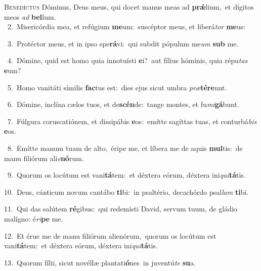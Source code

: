 \lettrine{\initial\textcolor{\initialcolor}{B}}{enedíctus} Dóminus, Deus meus, qui docet manus meas ad \textbf{prǽ}\-lium,~\star et dígitos meos \textit{ad} \textbf{bel}\-lum.\\
{\numbfont\textcolor{\numbcolor}{~2.}}~Misericórdia mea, et refúgium \textbf{me}\-um:~\star suscéptor meus, et liberá\textit{tor} \textbf{me}\-us:\par
{\numbfont\textcolor{\numbcolor}{~3.}}~Protéctor meus, et in ipso spe\-\textbf{rá}\-vi:~\star qui subdit pópulum me\textit{um} \textbf{sub} me.\par
{\numbfont\textcolor{\numbcolor}{~4.}}~Dómine, quid est homo quia innotuísti \textbf{e}\-i?~\star aut fílius hóminis, quia répu\textit{tas} \textbf{e}\-um?\par
{\numbfont\textcolor{\numbcolor}{~5.}}~Homo vanitáti símilis \textbf{fac}\-tus est:~\star dies ejus sicut umbra \textit{præ}\-\textbf{tér}\textbf{e}unt.\par
{\numbfont\textcolor{\numbcolor}{~6.}}~Dómine, inclína cælos tuos, et de\-\textbf{scén}\-de:~\star tange montes, et fu\-\textit{mi}\-\textbf{gá}bunt.\par
{\numbfont\textcolor{\numbcolor}{~7.}}~Fúlgura coruscatiónem, et dissipábis \textbf{e}\-os:~\star emítte sagíttas tuas, et conturbá\textit{bis} \textbf{e}\-os.\par
{\numbfont\textcolor{\numbcolor}{~8.}}~Emítte manum tuam de alto,~\dagger éripe me, et líbera me de aquis \textbf{mul}\-tis:~\star de manu filiórum ali\-\textit{e}\-\textbf{nó}rum.\par
{\numbfont\textcolor{\numbcolor}{~9.}}~Quorum os locútum est vani\-\textbf{tá}\-tem:~\star et déxtera eórum, déxtera ini\-\textit{qui}\-\textbf{tá}tis.\par
{\numbfont\textcolor{\numbcolor}{10.}}~Deus, cánticum novum cantábo \textbf{ti}\-bi:~\star in psaltério, decachórdo psal\textit{lam} \textbf{ti}\-bi.\par
{\numbfont\textcolor{\numbcolor}{11.}}~Qui das salútem \textbf{ré}\-gibus:~\star qui redemísti David, servum tuum, de gládio malígno: é\-\textit{ri}\-\textbf{pe} me.\par
{\numbfont\textcolor{\numbcolor}{12.}}~Et érue me de manu filiórum alienórum,~\dagger quorum os locútum est vani\-\textbf{tá}\-tem:~\star et déxtera eórum, déxtera ini\-\textit{qui}\-\textbf{tá}tis.\par
{\numbfont\textcolor{\numbcolor}{13.}}~Quorum fílii, sicut novéllæ plantati\-\textbf{ó}\-nes~\star in juventú\textit{te} \textbf{su}\-a.\par
